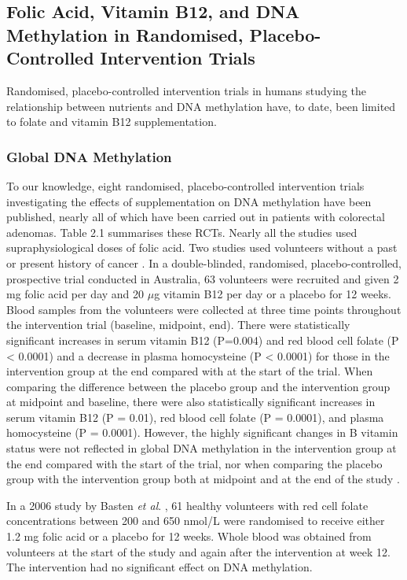 \subsection{Folic Acid, Vitamin B12, and DNA Methylation in Randomised, Placebo-Controlled Intervention Trials} %
\noindent Randomised, placebo-controlled intervention trials in humans studying the relationship between nutrients and DNA methylation have, to date, been limited to folate and vitamin B12 supplementation. 
 
\subsubsection{Global DNA Methylation} %
\noindent To our knowledge, eight randomised, placebo-controlled intervention trials investigating the effects of supplementation on DNA methylation have been published, nearly all of which have been carried out in patients with colorectal adenomas. Table 2.1 summarises these RCTs. Nearly all the studies used supraphysiological doses of folic acid. Two studies used volunteers without a past or present history of cancer \cite{c251,c252}. In a double-blinded, randomised, placebo-controlled, prospective trial conducted in Australia, 63 volunteers were recruited and given 2 mg folic acid per day and 20 $\mu$g vitamin B12 per day or a placebo for 12 weeks. Blood samples from the volunteers were collected at three time points throughout the intervention trial (baseline, midpoint, end). There were statistically significant increases in serum vitamin B12 (P=0.004) and red blood cell folate (P < 0.0001) and a decrease in plasma homocysteine (P < 0.0001) for those in the intervention group at the end compared with at the start of the trial. When comparing the difference between the placebo group and the intervention group at midpoint and baseline, there were also statistically significant increases in serum vitamin B12 (P = 0.01), red blood cell folate (P = 0.0001), and plasma homocysteine (P = 0.0001). However, the highly significant changes in B vitamin status were not reflected in global DNA methylation in the intervention group at the end compared with the start of the trial, nor when comparing the placebo group with the intervention group both at midpoint and at the end of the study \cite{c252}. 
 
\noindent In a 2006 study by Basten \emph{et al}. \cite{c251}, 61 healthy volunteers with red cell folate concentrations between 200 and 650 nmol/L were randomised to receive either 1.2 mg folic acid or a placebo for 12 weeks. Whole blood was obtained from volunteers at the start of the study and again after the intervention at week 12. The intervention had no significant effect on DNA methylation. 
 
